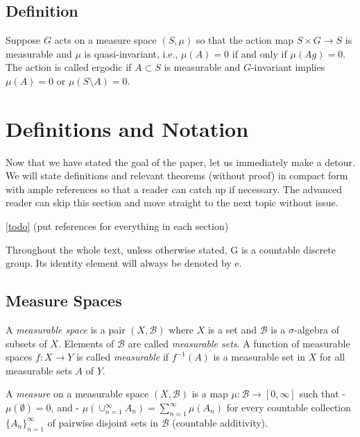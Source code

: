 \documentclass[
]{article}
\begin{document}
\hypertarget{definition}{%
\subsection{Definition}\label{definition}}

Suppose \(G\) acts on a measure space \((S, \mu)\) so that the action
map \(S \times G \rightarrow S\) is measurable and \(\mu\) is
quasi-invariant, i.e., \(\mu(A) = 0\) if and only if \(\mu(Ag) = 0\).
The action is called ergodic if \(A \subset S\) is measurable and
\(G\)-invariant implies \(\mu(A) = 0\) or \(\mu(S\setminus A) = 0\).








\hypertarget{definitions-and-notation}{%
\section{Definitions and Notation}\label{definitions-and-notation}}

Now that we have stated the goal of the paper, let us immediately make a
detour. We will state definitions and relevant theorems (without proof)
in compact form with ample references so that a reader can catch up if
necessary. The advanced reader can skip this section and move straight
to the next topic without issue.

\href{ergodicity}{{[}todo{]}} (put references for everything in each
section)

Throughout the whole text, unless otherwise stated, G is a countable
discrete group. Its identity element will always be denoted by e.

\hypertarget{measure-spaces}{%
\subsection{Measure Spaces}\label{measure-spaces}}

A \emph{measurable space} is a pair \((X, \mathscr{B})\) where \(X\) is
a set and \(\mathscr{B}\) is a \(\sigma\)-algebra of subsets of \(X\).
Elements of \(\mathscr{B}\) are called \emph{measurable sets}. A
function of measurable spaces \(f: X \rightarrow Y\) is called
\emph{measurable} if \(f^{-1}(A)\) is a measurable set in \(X\) for all
measurable sets \(A\) of \(Y\).

A \emph{measure} on a measurable space \((X, \mathscr{B})\) is a map
\(\mu: \mathscr{B} \rightarrow [0, \infty]\) such that -
\(\mu(\emptyset) = 0\), and -
\(\mu(\cup_{n=1}^{\infty} A_n) = \sum_{n=1}^{\infty} \mu(A_n)\) for
every countable collection \(\{A_n\}_{n=1}^{\infty}\) of pairwise
disjoint sets in \(\mathscr{B}\) (countable additivity).
\end{document}
